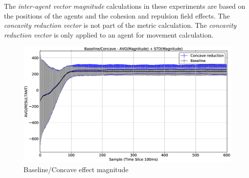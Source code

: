 The \textit{inter-agent vector magnitude} calculations in these experiments are based on the positions of the agents and the cohesion and repulsion field effects. The \textit{concavity reduction vector} is not part of the metric calculation. The \textit{concavity reduction vector} is only applied to an agent for movement calculation. 

\begin{figure}[H]
\begin{center}
\includegraphics[width=14cm]{CHAPTER-7/figures/BaselineConcaveEffectMag}
\end{center}
\caption{Baseline/Concave effect magnitude\label{concave:BaselineConcaveEffectMag}}
\end{figure}

